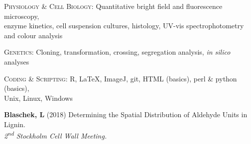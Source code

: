 \documentclass[11pt]{article}
\begin{document}
\vspace{0.2cm}

\textsc{\large{Physiology \& Cell Biology: }} Quantitative bright field and fluorescence microscopy, \\
\hspace*{24pt} enzyme kinetics, cell suspension cultures, histology, UV-vis spectrophotometry \\
\hspace*{24pt} and colour analysis 
\vspace{0.2cm}

\textsc{\large{Genetics: }} Cloning, transformation, crossing, segregation analysis, \textit{in silico} analyses
\vspace{0.2cm}

\textsc{\large{Coding \& Scripting: }} R, \LaTeX, ImageJ, git, HTML (basics), perl \& python (basics), \\
\hspace*{24pt} Unix, Linux, Windows
\vspace{1cm}

\vspace{0.2cm}

\textbf{Blaschek, L} (2018) Determining the Spatial Distribution of Aldehyde Units in Lignin.\\
\hspace*{24pt} \textit{2\textsuperscript{nd} Stockholm Cell Wall Meeting.}
 
\vspace{0.2cm}
\end{document}
